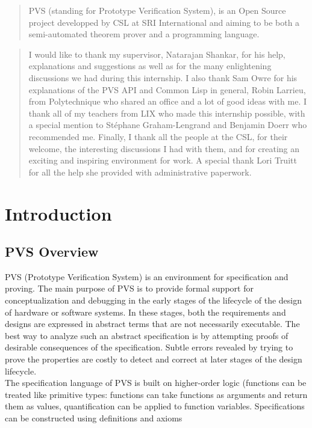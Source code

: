 \documentclass[12pt,a4paper]{article}
\begin{document}



\vspace{2.2in}
\begin{abstract}
PVS (standing for Prototype Verification System), is an Open Source project developped by CSL at SRI International and aiming to be both a semi-automated theorem prover and a programming language.
\end{abstract}

\renewcommand{\abstractname}{Acknowledgements}
\begin{abstract}
I would like to thank my supervisor, Natarajan Shankar, for
his help, explanations and suggestions as well as for the many enlightening discussions we had during this internship. I also thank Sam Owre for his explanations of the PVS API and Common Lisp in general, Robin Larrieu, from Polytechnique who shared an office and a lot of good ideas with me. I thank all of my teachers from  LIX who made this internship possible, with a special mention to Stéphane Graham-Lengrand and Benjamin Doerr who recommended me.
Finally, I thank all the people at the CSL, for their welcome, the interesting discussions I had with them, and for creating an exciting and inspiring environment for work. 
A special thank Lori Truitt for all the help she provided with administrative paperwork.
\end{abstract}


\newpage
\tableofcontents
\newpage

\section{Introduction}


\subsection{PVS Overview}

PVS  (Prototype Verification System) is an environment for specification and proving. The main purpose of PVS is to provide 
formal support for conceptualization and debugging in the early stages of the lifecycle of the design
of hardware or software systems. In these stages, both the requirements and designs are expressed in abstract
terms that are not necessarily executable. The best way to analyze such an abstract specification is by 
attempting proofs of desirable consequences of the specification. Subtle errors revealed by trying to prove
the properties are costly to detect and correct at later stages of the design lifecycle.
\\The specification language of PVS is built on higher-order logic (functions can be treated like
primitive types: functions can take functions as arguments and return them as values, quantification
can be applied to function variables. Specifications can be constructed using definitions and axioms
\end{document}
